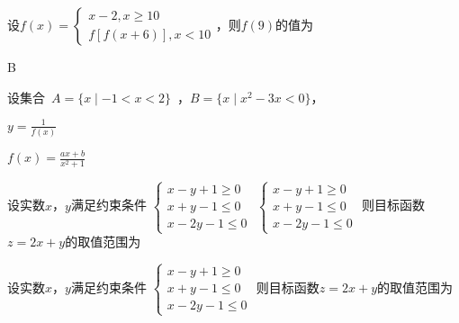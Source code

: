       \item
    设$f(x)=\begin{cases}
      x-2,x\geq10\\f[f(x+6)],x<10
    \end{cases}$，则$f(9)$的值为\xz
    \begin{answer}
      B
    \end{answer}
  \item  
      设集合~$A=\{x\mid -1< x <2\}$~，$B=\{x\mid x^2-3x<0\}$，
       \item
      $y=\frac1{f(x)}$
    \item
      $f(x)=\frac{ax+b}{x^2+1}$\\
       
  \item %
    设实数$x$，$y$满足约束条件
    $\left\{\begin{aligned}
      x-y+1\geqslant0\\
      x+y-1\leqslant0\\
      x-2y-1\leqslant0
    \end{aligned}\right.$
    $\begin{cases}
      x-y+1\geqslant0\\
      x+y-1\leqslant0\\
      x-2y-1\leqslant0
    \end{cases}$
    则目标函数$z=2x+y$的取值范围为\xz
    \xx{$[1,+\infty)$}{$[2,+\infty)$}{$[-8,1]$}{$[-8,2]$}
  \item %
    设实数$x$，$y$满足约束条件
    $\begin{cases}
      x-y+1\geqslant0\\
      x+y-1\leqslant0\\
      x-2y-1\leqslant0
    \end{cases}$
    则目标函数$z=2x+y$的取值范围为\xz
    \xx{$[1,+\infty)$}{$[2,+\infty)$}{$[-8,1]$}{$[-8,2]$}